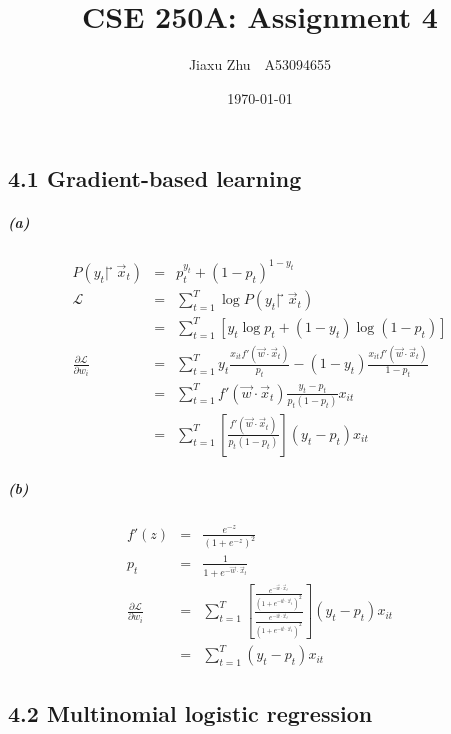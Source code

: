 \documentclass{article}
\begin{document}
\title{CSE 250A: Assignment 4}
\author{Jiaxu Zhu~~A53094655}
\date{\today}
\maketitle
\subsection*{4.1 Gradient-based learning}
\subparagraph*{(a)}
\begin{eqnarray*}
	P(y_t|⃗\vec{x}_t) &=& p_t^{y_t} + (1-p_t)^{1-y_t} \\
	\mathcal{L} &=& \sum_{t=1}^{T}\log P(y_t|⃗\vec{x}_t) \\
	&=&\sum_{t=1}^{T}[y_t\log p_t + (1-y_t)\log (1-p_t)]\\
	\frac{\partial \mathcal{L}}{\partial w_i}	
	&=& \sum_{t=1}^{T} y_t \frac{x_{it}f'(\vec{w} \cdot \vec{x}_t)}{p_t} - (1 - y_t) \frac{x_{it}f'(\vec{w} \cdot \vec{x}_t)}{1-p_t}\\
	&=& \sum_{t=1}^{T} f'(\vec{w} \cdot \vec{x}_t) \frac{y_t - p_t}{p_t(1-p_t)} x_{it}\\
	&=& \sum_{t=1}^{T} \left[\frac{f'(\vec{w} \cdot \vec{x}_t)}{p_t(1-p_t)}\right](y_t - p_t)x_{it}
\end{eqnarray*}

\subparagraph*{(b)}
\begin{eqnarray*}
	f'(z) &=& \frac{e^{-z}}{(1+e^{-z})^2}\\
	p_t &=& \frac{1}{1+e^{-\vec{w} \cdot \vec{x}_t}}\\
	\frac{\partial \mathcal{L}}{\partial w_i} &=& \sum_{t=1}^{T}\left[\frac{\frac{e^{-\vec{w} \cdot \vec{x}_t}}{(1+e^{-\vec{w} \cdot \vec{x}_t})^2}}{\frac{e^{-\vec{w} \cdot \vec{x}_t}}{(1+e^{-\vec{w} \cdot \vec{x}_t})^2}}\right](y_t - p_t)x_{it}\\
	&=&\sum_{t=1}^{T}(y_t - p_t)x_{it}
\end{eqnarray*}

\subsection*{4.2 Multinomial logistic regression}
\end{document}
